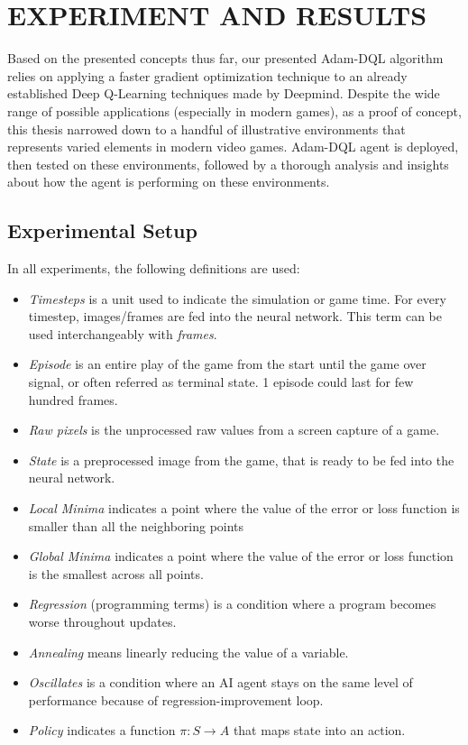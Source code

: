 \chapter{EXPERIMENT AND RESULTS}
\thispagestyle{fancy}

    Based on the presented concepts thus far, our presented Adam-DQL algorithm relies on applying a faster gradient optimization technique to an already established Deep Q-Learning techniques made by Deepmind. Despite the wide range of possible applications (especially in modern games), as a proof of concept, this thesis narrowed down to a handful of illustrative environments that represents varied elements in modern video games. Adam-DQL agent is deployed, then tested on these environments, followed by a thorough analysis and insights about how the agent is performing on these environments.
    
    \section{Experimental Setup}
    In all experiments, the following definitions are used:
    \begin{itemize}
        \item \textit{Timesteps} is a unit used to indicate the simulation or game time. For every timestep, images/frames are fed into the neural network. This term can be used interchangeably with \textit{frames}.
        \item \textit{Episode} is an entire play of the game from the start until the game over signal, or often referred as terminal state. 1 episode could last for few hundred frames.
        \item \textit{Raw pixels} is the unprocessed raw values from a screen capture of a game.
        \item \textit{State} is a preprocessed image from the game, that is ready to be fed into the neural network. 
        \item \textit{Local Minima} indicates a point where the value of the error or loss function is smaller than all the neighboring points
        \item \textit{Global Minima} indicates a point where the value of the error or loss function is the smallest across all points.
        \item \textit{Regression} (programming terms) is a condition where a program becomes worse throughout updates.
        \item \textit{Annealing} means linearly reducing the value of a variable.
        \item \textit{Oscillates} is a condition where an AI agent stays on the same level of performance because of regression-improvement loop.
        \item \textit{Policy} indicates a function $\pi: S \to A$ that maps state into an action. 
    \end{itemize}
    
